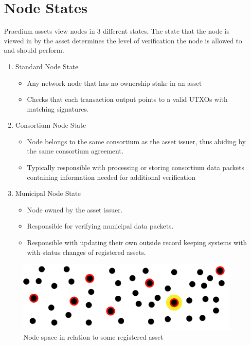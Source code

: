 \documentclass[12pt]{article}
\begin{document}
\section{Node States}

Praedium assets view nodes in 3 different states. The state that the node is viewed in 
by the asset determines the level of verification the node is allowed to and should
perform.


\begin{enumerate}
	\item Standard Node State
		\begin{itemize}
			\item{Any network node that has no ownership stake in an asset}
			\item{Checks that each transaction output points to a valid UTXOs
				with matching signatures.}
		\end{itemize}
	\item Consortium Node State
		\begin{itemize}
			\item{Node belongs to the same consortium as the asset issuer,
				thus abiding by the same consortium agreement.}
			\item{Typically responsible with processing  or storing
				consortium data packets containing information 
				needed for additional verification}
		\end{itemize}
	\item Municipal Node State
		\begin{itemize}
			\item{Node owned by the asset issuer.}
			\item{Responsible for verifying municipal data packets.}
			\item{Responsible with updating their own outside record keeping systems with
				with status changes of registered assets.}	
		\end{itemize}
\end{enumerate}

\begin{figure}[h]
	\centering
	\includegraphics[width=.85\textwidth]{node_space}
	\caption{Node space in relation to some registered asset}
	\label{fig:nodespace1}
\end{figure}
\end{document}
